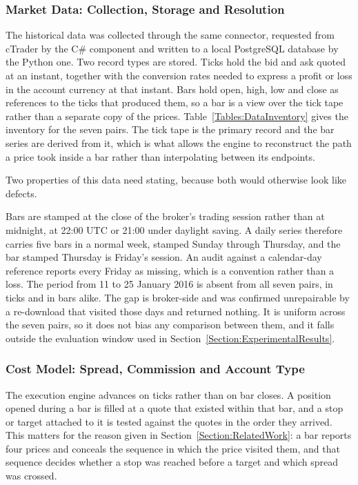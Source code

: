 \subsubsection{Market Data: Collection, Storage and Resolution}

The historical data was collected through the same connector, requested from cTrader by the C\# component and written to a local PostgreSQL database by the Python one. Two record types are stored. Ticks hold the bid and ask quoted at an instant, together with the conversion rates needed to express a profit or loss in the account currency at that instant. Bars hold open, high, low and close as references to the ticks that produced them, so a bar is a view over the tick tape rather than a separate copy of the prices. Table~\ref{Tables:DataInventory} gives the inventory for the seven pairs. The tick tape is the primary record and the bar series are derived from it, which is what allows the engine to reconstruct the path a price took inside a bar rather than interpolating between its endpoints.



Two properties of this data need stating, because both would otherwise look like defects.

Bars are stamped at the close of the broker's trading session rather than at midnight, at 22:00 UTC or 21:00 under daylight saving. A daily series therefore carries five bars in a normal week, stamped Sunday through Thursday, and the bar stamped Thursday is Friday's session. An audit against a calendar-day reference reports every Friday as missing, which is a convention rather than a loss. The period from 11 to 25 January 2016 is absent from all seven pairs, in ticks and in bars alike. The gap is broker-side and was confirmed unrepairable by a re-download that visited those days and returned nothing. It is uniform across the seven pairs, so it does not bias any comparison between them, and it falls outside the evaluation window used in Section~\ref{Section:ExperimentalResults}.

\subsubsection{Cost Model: Spread, Commission and Account Type}

The execution engine advances on ticks rather than on bar closes. A position opened during a bar is filled at a quote that existed within that bar, and a stop or target attached to it is tested against the quotes in the order they arrived. This matters for the reason given in Section~\ref{Section:RelatedWork}: a bar reports four prices and conceals the sequence in which the price visited them, and that sequence decides whether a stop was reached before a target and which spread was crossed.

